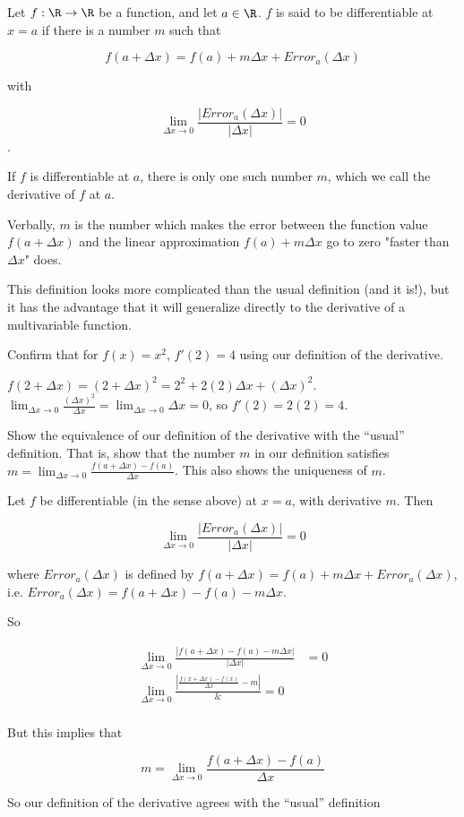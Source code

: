 \documentclass{ximera}
\begin{document}
	\begin{definition}
		Let $f: \R \to \R$ be a function, and let $a \in \R$.  $f$ is said to be differentiable at $x=a$ if there is a number $m$ such that 
		
		\[ f(a+\Delta x) = f(a) + m\Delta x + Error_a(\Delta x)\]
		
		with
		
		\[ \lim_{\Delta x \to 0} \frac{\left|Error_a(\Delta x)|}{\left|\Delta x\right|} = 0 \].
		
		If $f$ is differentiable at $a$, there is only one such number $m$, which we call the derivative of $f$ at $a$.  
		
		Verbally,  $m$ is the number which makes the error between the function value $f(a+\Delta x)$ and the linear approximation $f(a)+m\Delta x$ go to zero 
		"faster than $\Delta x$" does.
	\end{definition}
	
	This definition looks more complicated than the usual definition (and it is!), but it has the advantage that it will 
	generalize directly to the derivative of a multivariable function.
	

	Confirm that for $f(x)=x^2$, $f'(2)=4$ using our definition of the derivative.
	
	\begin{free-response}
	 	$f(2+\Delta x) = (2+\Delta x)^2 = 2^2+2(2)\Delta x + (\Delta x)^2$.  $\lim_{\Delta x \to 0} \frac{(\Delta x)^2}{\Delta x} = \lim_{\Delta x \to 0} \Delta x = 0$, so 
	 	$f'(2) = 2(2) =4$.
	\end{free-response}

		Show the equivalence of our definition of the derivative with the ``usual'' definition.  That is, show that the number $m$ in our definition satisfies
		$m = \lim_{\Delta x \to 0}\frac{f(a+\Delta x)-f(a)}{\Delta x}$.  This also shows the uniqueness of $m$.

	\begin{free-response}
		Let $f$ be differentiable (in the sense above) at $x=a$, with derivative $m$.  Then 
		
		\[ \lim_{\Delta x \to 0} \frac{\left|Error_a(\Delta x)|}{\left|\Delta x\right|} = 0 \]
		
		where $Error_a(\Delta x)$ is defined by $f(a+\Delta x) = f(a) + m\Delta x + Error_a(\Delta x)$, i.e. $Error_a(\Delta x) = f(a+\Delta x) - f(a) -m\Delta x$.
		
		So 
		
		\begin{align*}
			\lim_{\Delta x \to 0} \frac{\left|f(a+\Delta x) - f(a) -m\Delta x|}{\left|\Delta x\right|} &= 0\\
			\lim_{\Delta x \to 0} \frac{\left| \frac{f(x+\Delta x) -f(x)}{\Delta x} - m\right|} &= 0\\
		\end{align*}
		
		But this implies that
		
		\[m = \lim_{\Delta x \to 0}\frac{f(a+\Delta x)-f(a)}{\Delta x}\]
		
		So our definition of the derivative agrees with the  ``usual'' definition

		\end{free-response}
	
	
\end{document}
